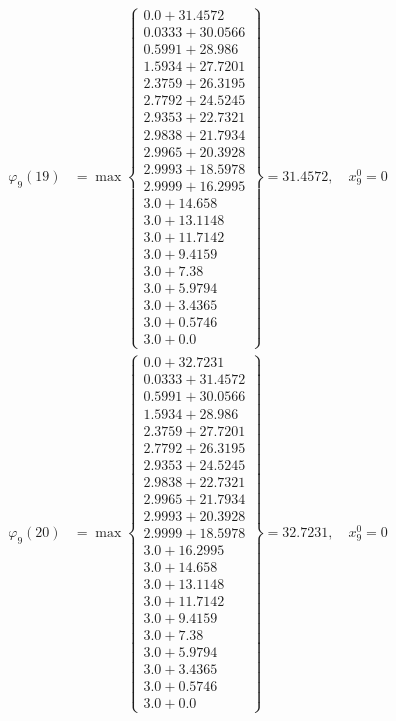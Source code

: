 \documentclass{article}
\begin{document}
\begin{align*}
  
  
  
\varphi_{9}(19) &= \max \left\{ \begin{array}{c}
0.0 + 31.4572 \\
 0.0333 + 30.0566 \\
 0.5991 + 28.986 \\
 1.5934 + 27.7201 \\
 2.3759 + 26.3195 \\
 2.7792 + 24.5245 \\
 2.9353 + 22.7321 \\
 2.9838 + 21.7934 \\
 2.9965 + 20.3928 \\
 2.9993 + 18.5978 \\
 2.9999 + 16.2995 \\
 3.0 + 14.658 \\
 3.0 + 13.1148 \\
 3.0 + 11.7142 \\
 3.0 + 9.4159 \\
 3.0 + 7.38 \\
 3.0 + 5.9794 \\
 3.0 + 3.4365 \\
 3.0 + 0.5746 \\
 3.0 + 0.0
\end{array} \right\}=31.4572,\quad x_{9}^0=0\\
  
  
  
  
\varphi_{9}(20) &= \max \left\{ \begin{array}{c}
0.0 + 32.7231 \\
 0.0333 + 31.4572 \\
 0.5991 + 30.0566 \\
 1.5934 + 28.986 \\
 2.3759 + 27.7201 \\
 2.7792 + 26.3195 \\
 2.9353 + 24.5245 \\
 2.9838 + 22.7321 \\
 2.9965 + 21.7934 \\
 2.9993 + 20.3928 \\
 2.9999 + 18.5978 \\
 3.0 + 16.2995 \\
 3.0 + 14.658 \\
 3.0 + 13.1148 \\
 3.0 + 11.7142 \\
 3.0 + 9.4159 \\
 3.0 + 7.38 \\
 3.0 + 5.9794 \\
 3.0 + 3.4365 \\
 3.0 + 0.5746 \\
 3.0 + 0.0
\end{array} \right\}=32.7231,\quad x_{9}^0=0\\
  

\end{align*}
\end{document}
